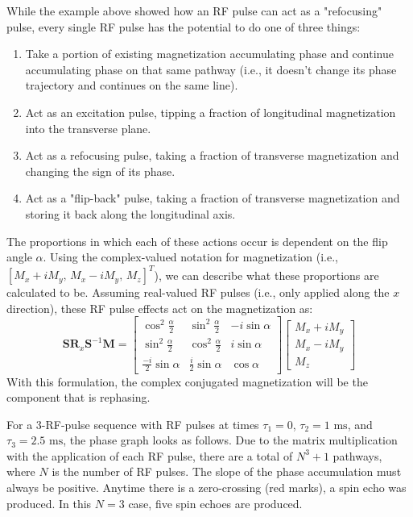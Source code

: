 \documentclass[11pt]{article}
\theoremstyle{definition}
\begin{document}
While the example above showed how an RF pulse can act as a "refocusing" pulse, every single RF pulse has the potential to do one of three things:
\begin{enumerate}
    \item Take a portion of existing magnetization accumulating phase and continue accumulating phase on that same pathway (i.e., it doesn't change its phase trajectory and continues on the same line).
    \item Act as an excitation pulse, tipping a fraction of longitudinal magnetization into the transverse plane.
    \item Act as a refocusing pulse, taking a fraction of transverse magnetization and changing the sign of its phase. 
    \item Act as a "flip-back" pulse, taking a fraction of transverse magnetization and storing it back along the longitudinal axis. 
\end{enumerate}
The proportions in which each of these actions occur is dependent on the flip angle $\alpha$. Using the complex-valued notation for magnetization (i.e., $[M_x + iM_y\text{, } M_x - iM_y\text{, } M_z]^T$), we can describe what these proportions are calculated to be. Assuming real-valued RF pulses (i.e., only applied along the $x$ direction), these RF pulse effects act on the magnetization as: 
\begin{equation}
    \mathbf{S}\mathbf{R}_x\mathbf{S}^{-1}\mathbf{M} = 
    \begin{bmatrix}
        \cos^2\frac{\alpha}{2} & \sin^2\frac{\alpha}{2} & -i\sin \alpha\\
        \sin^2\frac{\alpha}{2} & \cos^2\frac{\alpha}{2} & i\sin \alpha\\
        \frac{-i}{2}\sin \alpha & \frac{i}{2}\sin \alpha & \cos \alpha
    \end{bmatrix}
    \begin{bmatrix}
        M_x + iM_y\\
        M_x - iM_y\\
        M_z
    \end{bmatrix}
\end{equation}
With this formulation, the complex conjugated magnetization will be the component that is rephasing. 

For a 3-RF-pulse sequence with RF pulses at times $\tau_1=0$, $\tau_2=1\text{ ms}$, and $\tau_3=2.5\text{ ms}$, the phase graph looks as follows. Due to the matrix multiplication with the application of each RF pulse, there are a total of $N^3+1$ pathways, where $N$ is the number of RF pulses. The slope of the phase accumulation must always be positive. Anytime there is a zero-crossing (red marks), a spin echo was produced. In this $N=3$ case, five spin echoes are produced. 
\end{document}
